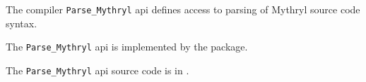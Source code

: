 
The compiler {\tt Parse\_Mythryl} api defines access to parsing of Mythryl source code syntax.

The {\tt Parse\_Mythryl} api is implemented by the  package.

The {\tt Parse\_Mythryl} api source code is in .



